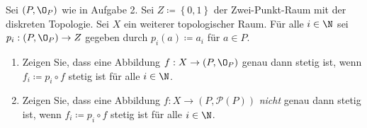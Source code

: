 \begin{assignment}
  Sei \( (P, \O_P) \) wie in Aufgabe 2. Sei \( Z \coloneqq \left \{ 0,1 \right \} \) der Zwei-Punkt-Raum mit der diskreten Topologie. Sei \( X \) ein weiterer topologischer Raum. Für alle \( i \in \N \) sei \( p_i : (P, \O_P) \to Z \) gegeben durch \( p_i(a) \coloneqq a_i \) für \( a \in P \).
  \begin{enumerate}[label= (\alph*)]
    \item Zeigen Sie, dass eine Abbildung \( f: X \to (P,\O_P) \) genau dann stetig ist, wenn \( f_i \coloneqq p_i \circ f \) stetig ist für alle \( i \in \N \).
    \item Zeigen Sie, dass eine Abbildung \( f: X \to (P,\mathcal{P}(P)) \) \emph{nicht} genau dann stetig ist, wenn \( f_i \coloneqq p_i \circ f \) stetig ist für alle \( i \in \N \).
  \end{enumerate}
\end{assignment}
